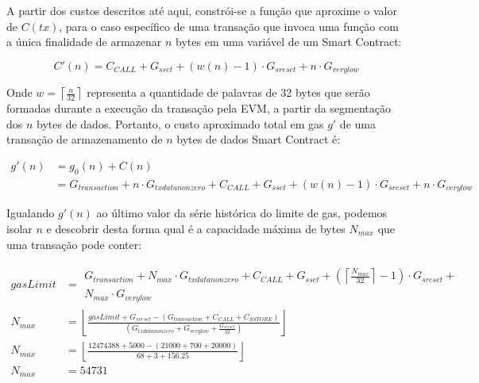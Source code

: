 \documentclass[a4paper,11pt]{article}
\begin{document}
A partir dos custos descritos até aqui, constrói-se a função que aproxime o valor de $C(tx)$, para o caso específico de uma transação que invoca uma função com a única finalidade de armazenar $n$ bytes em uma variável de um Smart Contract:

\begin{equation}
    C'(n) = C_{CALL} + G_{sset} +  ( w(n) - 1 ) \cdot G_{sreset} + n \cdot G_{verylow}
\end{equation}


Onde $w = \left\lceil \frac{n}{32} \right\rceil $ representa a quantidade de palavras de 32 bytes que serão formadas durante a execução da transação pela EVM, a partir da segmentação dos $n$ bytes de dados.
Portanto, o custo aproximado total em gas $g'$ de uma transação de armazenamento de $n$ bytes de dados Smart Contract é:

\begin{equation}
  \begin{aligned}
    g'(n) & = g_{0}(n) + C(n)\\
      & = G_{transaction} + n \cdot G_{txdatanonzero} + C_{CALL} + G_{sset} +  ( w(n) - 1 ) \cdot G_{sreset} + n \cdot G_{verylow}
  \end{aligned}
\end{equation}

Igualando $g'(n)$ ao último valor da série histórica do limite de gas, podemos isolar $n$ e descobrir desta forma qual é a capacidade máxima de bytes $N_{max}$ que uma transação pode conter:

\begin{equation}
  \begin{aligned}
    gasLimit & =\begin{aligned}
                    G_{transaction} + N_{max} \cdot G_{txdatanonzero} + C_{CALL} + G_{sset} + ( \left\lceil \frac{N_{max}}{32} \right\rceil - 1 ) \cdot G_{sreset} + \\ N_{max} \cdot G_{verylow}
                \end{aligned} \\
     N_{max} & = \left\lfloor \frac{gasLimit + G_{sreset} - (G_{transaction} + C_{CALL} + C_{SSTORE})}{(G_{txdatanonzero} + G_{verylow} + \frac{G_{sreset}}{32})} \right\rfloor \\
     N_{max} & = \left\lfloor \frac{12474388 + 5000 - (21000 + 700 + 20000)}{68 + 3 + 156.25} \right\rfloor \\
     N_{max} & = 54731
  \end{aligned}
\end{equation}
\end{document}
